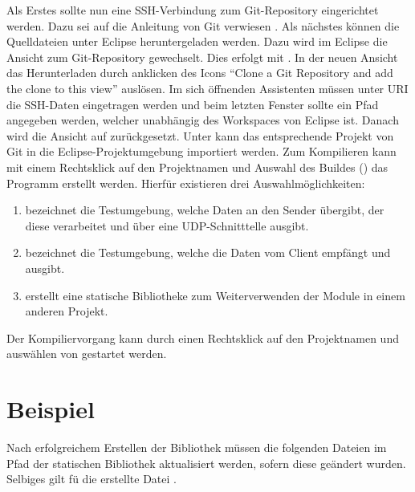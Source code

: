 Als Erstes sollte nun eine SSH-Verbindung zum Git-Repository eingerichtet
werden.
Dazu sei auf die Anleitung von Git verwiesen
\cite{web7}. Als n{\"a}chstes k{\"o}nnen
die Quelldateien unter Eclipse heruntergeladen werden. Dazu wird im Eclipse die
Ansicht zum Git-Repository gewechselt. Dies erfolgt mit . In der neuen Ansicht das Herunterladen durch anklicken des
Icons "`Clone a Git Repository and add the clone to this view"' ausl{\"o}sen. Im
sich {\"o}ffnenden Assistenten m{\"u}ssen unter URI die SSH-Daten
 eingetragen werden und
beim letzten Fenster sollte ein Pfad angegeben werden, welcher
unabh{\"a}ngig des Workspaces von Eclipse ist.\newline
Danach wird die Ansicht auf 
zur{\"u}ckgesetzt. Unter  kann das entsprechende Projekt von Git
in die Eclipse-Projektumgebung importiert werden. Zum Kompilieren kann
mit einem Rechtsklick auf den Projektnamen und Auswahl des Buildes () das Programm erstellt werden. Hierf{\"u}r existieren
drei Auswahlm{\"o}glichkeiten:

\begin{enumerate}
\item {} bezeichnet die Testumgebung, welche
Daten an den Sender {\"u}bergibt, der diese verarbeitet und {\"u}ber eine
\gls{UDP}-Schnitttelle ausgibt.
\item {} bezeichnet die Testumgebung, welche die
Daten vom Client empf{\"a}ngt und ausgibt.
\item {} erstellt eine statische Bibliotheke zum Weiterverwenden der
Module in einem anderen Projekt.
\end{enumerate}

Der Kompiliervorgang kann durch einen Rechtsklick auf den Projektnamen und
ausw{\"a}hlen von  gestartet werden.

\section{Beispiel}

Nach erfolgreichem Erstellen der Bibliothek m{\"u}ssen die folgenden Dateien
im Pfad  der statischen Bibliothek aktualisiert werden,
sofern diese ge{\"a}ndert wurden. Selbiges gilt f{\"u} die erstellte Datei
.

